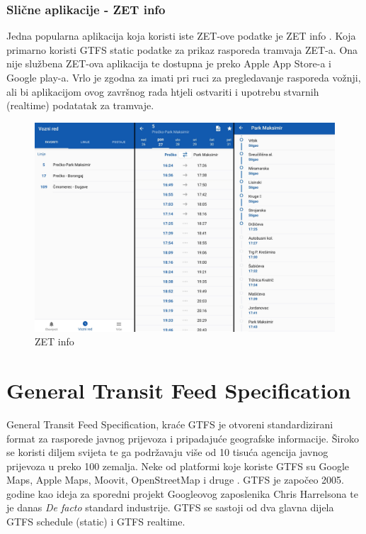 \documentclass[zavrsnirad]{fer}
\begin{document}
\subsubsection{Slične aplikacije - ZET info}
Jedna popularna aplikacija koja koristi iste ZET-ove podatke je ZET info \cite{ZET-info}. Koja primarno koristi GTFS static podatke za prikaz rasporeda tramvaja ZET-a. Ona nije službena ZET-ova aplikacija te dostupna je preko Apple App Store-a i Google play-a. Vrlo je zgodna za imati pri ruci za pregledavanje rasporeda vožnji, ali bi aplikacijom ovog završnog rada htjeli ostvariti i upotrebu stvarnih (realtime) podatatak za tramvaje.


\begin{figure}[htb]
	\centering
	\includegraphics[width=0.85\linewidth]{Figures/zetinfo.png} 
	\caption{ZET info}
	\label{slk:zet-info}
\end{figure}

\newpage
\section[GTFS]{General Transit Feed Specification}
\label{sec:GTFS}

General Transit Feed Specification, kraće GTFS je otvoreni standardizirani format za rasporede
javnog prijevoza i pripadajuće geografske informacije. Široko se koristi diljem svijeta te ga
podržavaju više od 10 tisuća agencija javnog prijevoza u preko 100 zemalja. Neke od platformi koje
koriste GTFS su Google Maps, Apple Maps, Moovit, OpenStreetMap i druge \cite{GTFS}. GTFS je započeo 2005. godine kao ideja za sporedni projekt Googleovog zaposlenika Chris Harrelsona te je danas \textit{De facto} standard industrije. GTFS se sastoji od dva glavna dijela GTFS schedule (static) i GTFS realtime.
\end{document}

